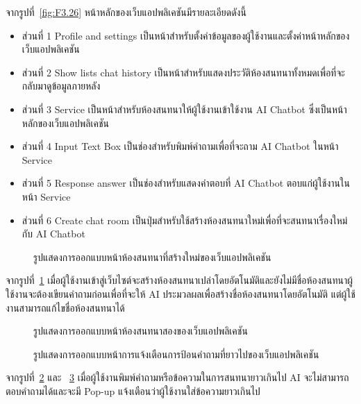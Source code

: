 \documentclass[12pt,oneside,openright,a4paper]{cpe-thai-project}
\begin{document}
จากรูปที่~\ref{fig:F3.26} หน้าหลักของเว็บแอปพลิเคชันมีรายละเอียดดังนี้
\begin{itemize}
\item ส่วนที่ 1 Profile and settings เป็นหน้าสำหรับตั้งค่าข้อมูลของผู้ใช้งานและตั้งค่าหน้าหลักของเว็บแอปพลิเคชัน
\item ส่วนที่ 2 Show lists chat history เป็นหน้าสำหรับแสดงประวัติห้องสนทนาทั้งหมดเพื่อที่จะกลับมาดูข้อมูลภายหลัง
\item ส่วนที่ 3 Service เป็นหน้าสำหรับห้องสนทนาให้ผู้ใช้งานเข้าใช้งาน AI Chatbot ซึ่งเป็นหน้าหลักของเว็บแอปพลิเคชัน
\item ส่วนที่ 4 Input Text Box เป็นช่องสำหรับพิมพ์คำถามเพื่อที่จะถาม AI Chatbot ในหน้า Service
\item ส่วนที่ 5 Response answer เป็นช่องสำหรับแสดงคำตอบที่ AI Chatbot ตอบแก่ผู้ใช้งานในหน้า Service
\item ส่วนที่ 6 Create chat room เป็นปุ่มสำหรับใช้สร้างห้องสนทนาใหม่เพื่อที่จะสนทนาเรื่องใหม่กับ AI Chatbot
\end{itemize}  \newpage

\begin{figure}[!h]\centering
\setlength{\fboxrule}{0mm}
\caption{รูปแสดงการออกแบบหน้าห้องสนทนาที่สร้างใหม่ของเว็บแอปพลิเคชัน}\label{fig:F3.27}
\end{figure}
จากรูปที่~\ref{fig:F3.27} เมื่อผู้ใช้งานเข้าสู่เว็บไซต์จะสร้างห้องสนทนาเปล่าโดยอัตโนมัติและยังไม่มีชื่อห้องสนทนาผู้ใช้งานจะต้องเขียนคำถามก่อนเพื่อที่จะให้ AI ประมวลผลเพื่อสร้างชื่อห้องสนทนาโดยอัตโนมัติ แต่ผู้ใช้งานสามารถแก้ไขชื่อห้องสนทนาได้ \\

\begin{figure}[!h]\centering
\setlength{\fboxrule}{0mm}
\caption{รูปแสดงการออกแบบหน้าห้องสนทนาสองของเว็บแอปพลิเคชัน}\label{fig:F3.28}
\end{figure}

\begin{figure}[!h]\centering
\setlength{\fboxrule}{0mm}
\caption{รูปแสดงการออกแบบหน้าการแจ้งเตือนการป้อนคำถามที่ยาวไปของเว็บแอปพลิเคชัน}\label{fig:F3.29}
\end{figure}
จากรูปที่~\ref{fig:F3.28} และ ~\ref{fig:F3.29} เมื่อผู้ใช้งานพิมพ์คำถามหรือข้อความในการสนทนายาวเกินไป AI จะไม่สามารถตอบคำถามได้และจะมี Pop-up แจ้งเตือนว่าผู้ใช้งานใส่ข้อความยาวเกินไป \\
\end{document}
